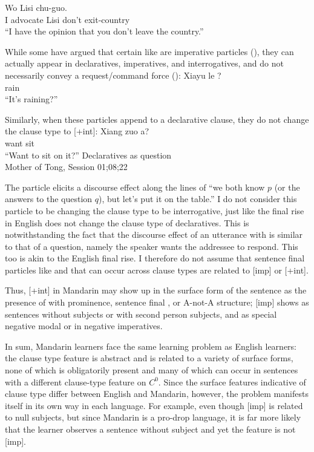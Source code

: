 \gll Wo  Lisi  chu-guo.\\
I advocate Lisi don't exit-country\\
\trans ``I have the opinion that you don't leave the country.'' \hfill \textcite[p.458]{lithompson}
\eex

While some have argued that certain  like  are imperative particles (\cite{zhudexi,chao1968,lithompson}), they can actually appear in declaratives, imperatives, and interrogatives, and do not necessarily convey a request/command force (\cite{hanyang1995,liboya2006,ettingermalamud2014,YY2021}):
Xiayu le ?\\
rain \Asp{} \Sfp{}\\
\trans ``It's raining?''
\eex

Similarly, when these particles append to a declarative clause, they do not change the clause type to [+int]:
\gll %
Xiang zuo a?\\
want sit \Sfp{}\\
``Want to sit on it?''
\hfill Declaratives as question\\
Mother of Tong, Session 01;08;22
\eex

The particle  elicits a discourse effect along the lines of ``we both know $p$ (or the answers to the question $q$), but let's put it on the table.'' I do not consider this particle to be changing the clause type to be interrogative, just like the final rise in English does not change the clause type of declaratives. This is notwithstanding the fact that the discourse effect of an utterance with  is similar to that of a question, namely the speaker wants the addressee to respond. This too is akin to the English final rise.
I therefore do not assume that sentence final particles like  and  that can occur across clause types are related to [imp] or [+int].

Thus, [+int] in Mandarin may show up in the surface form of the sentence as the presence of \twh{} with prominence, sentence final , or A-not-A structure; [imp] shows as sentences without subjects or with second person subjects, and as special negative modal  or  in negative imperatives. 

In sum, Mandarin learners face the same learning problem as English learners: the clause type feature is abstract and is related to a variety of surface forms, none of which is obligatorily present and many of which can occur in sentences with a different clause-type feature on $C^{0}$. Since the surface features indicative of clause type differ between English and Mandarin, however, the problem manifests itself in its own way in each language. For example, even though [imp] is related to null subjects, but since Mandarin is a pro-drop language, it is far more likely that the learner observes a sentence without subject and yet the feature is not [imp].  

